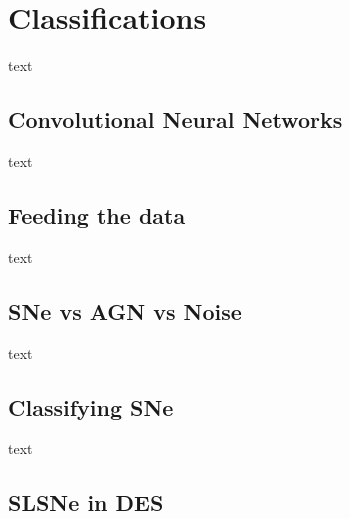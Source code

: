 \section{Classifications}
text
\subsection{Convolutional Neural Networks}
text
\subsection{Feeding the data}
text
\subsection{SNe vs AGN vs Noise}
text
\subsection{Classifying SNe}
text
\subsection{SLSNe in DES}
